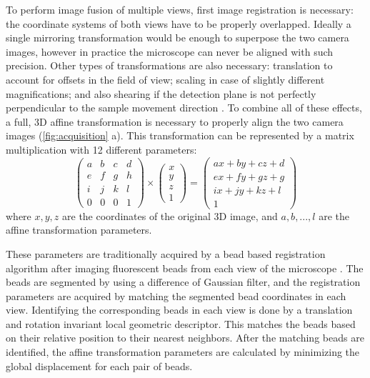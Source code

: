 To perform image fusion of multiple views, first image registration is necessary: the coordinate systems of both views have to be properly overlapped. Ideally a single mirroring transformation would be enough to superpose the two camera images, however in practice the microscope can never be aligned with such precision. Other types of transformations are also necessary: translation to account for offsets in the field of view; scaling in case of slightly different magnifications; and also shearing if the detection plane is not perfectly perpendicular to the sample movement direction \cite{krzic_multiple-view_2009}. To combine all of these effects, a full, 3D affine transformation is necessary to properly align the two camera images (\autoref{fig:acquisition} a). This transformation can be represented by a matrix multiplication with 12 different parameters:
\[
\begin{pmatrix}
a & b & c & d \\ 
e & f & g & h \\ 
i & j & k & l \\
0 & 0 & 0 & 1 
\end{pmatrix}
\times
\begin{pmatrix}
x\\
y\\
z\\
1
\end{pmatrix}
=
\begin{pmatrix}
a x + b y + c z + d\\ 
e x + f y + g z + g\\ 
i x + j y + k z + l\\
1
\end{pmatrix}
\]
where $x, y, z$ are the coordinates of the original 3D image, and $a, b, ..., l$ are the affine transformation parameters.

These parameters are traditionally acquired by a bead based registration algorithm after imaging fluorescent beads from each view of the microscope \cite{preibisch_bead-based_2009,preibisch_software_2010}. The beads are segmented by using a difference of Gaussian filter, and the registration parameters are acquired by matching the segmented bead coordinates in each view. Identifying the corresponding beads in each view is done by a translation and rotation invariant local geometric descriptor. This matches the beads based on their relative position to their nearest neighbors. After the matching beads are identified, the affine transformation parameters are calculated by minimizing the global displacement for each pair of beads.

